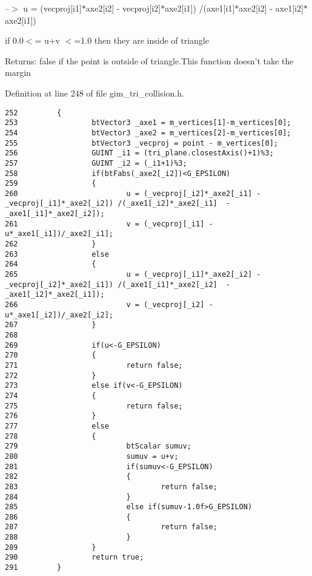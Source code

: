 --$>$ u = (vecproj\mbox{[}i1\mbox{]}$\ast$axe2\mbox{[}i2\mbox{]} - vecproj\mbox{[}i2\mbox{]}$\ast$axe2\mbox{[}i1\mbox{]}) /(axe1\mbox{[}i1\mbox{]}$\ast$axe2\mbox{[}i2\mbox{]} - axe1\mbox{[}i2\mbox{]}$\ast$axe2\mbox{[}i1\mbox{]})

if 0.0$<$= u+v $<$=1.0 then they are inside of triangle

\begin{Desc}
\item[Returns:]false if the point is outside of triangle.This function doesn't take the margin \end{Desc}


Definition at line 248 of file gim\_\-tri\_\-collision.h.

\begin{Code}\begin{verbatim}252         {
253                 btVector3 _axe1 = m_vertices[1]-m_vertices[0];
254                 btVector3 _axe2 = m_vertices[2]-m_vertices[0];
255                 btVector3 _vecproj = point - m_vertices[0];
256                 GUINT _i1 = (tri_plane.closestAxis()+1)%3;
257                 GUINT _i2 = (_i1+1)%3;
258                 if(btFabs(_axe2[_i2])<G_EPSILON)
259                 {
260                         u = (_vecproj[_i2]*_axe2[_i1] - _vecproj[_i1]*_axe2[_i2]) /(_axe1[_i2]*_axe2[_i1]  - _axe1[_i1]*_axe2[_i2]);
261                         v = (_vecproj[_i1] - u*_axe1[_i1])/_axe2[_i1];
262                 }
263                 else
264                 {
265                         u = (_vecproj[_i1]*_axe2[_i2] - _vecproj[_i2]*_axe2[_i1]) /(_axe1[_i1]*_axe2[_i2]  - _axe1[_i2]*_axe2[_i1]);
266                         v = (_vecproj[_i2] - u*_axe1[_i2])/_axe2[_i2];
267                 }
268 
269                 if(u<-G_EPSILON)
270                 {
271                         return false;
272                 }
273                 else if(v<-G_EPSILON)
274                 {
275                         return false;
276                 }
277                 else
278                 {
279                         btScalar sumuv;
280                         sumuv = u+v;
281                         if(sumuv<-G_EPSILON)
282                         {
283                                 return false;
284                         }
285                         else if(sumuv-1.0f>G_EPSILON)
286                         {
287                                 return false;
288                         }
289                 }
290                 return true;
291         }
\end{verbatim}
\end{Code}


